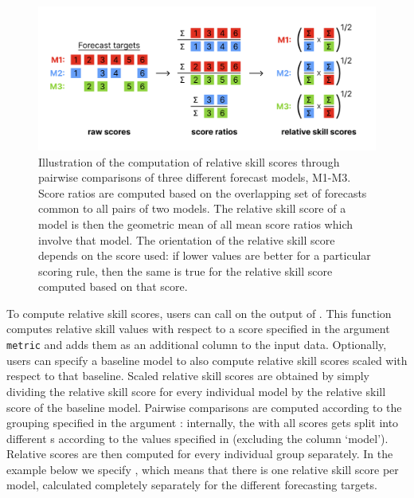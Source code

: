 \documentclass[
]{jss}
\begin{document}
\begin{CodeChunk}
\begin{figure}[!h]

{\centering \includegraphics[width=1\linewidth]{../../man/figures/pairwise-illustration} 

}

\caption[Illustration of the computation of relative skill scores through pairwise comparisons of three different forecast models, M1-M3]{Illustration of the computation of relative skill scores through pairwise comparisons of three different forecast models, M1-M3. Score ratios are computed based on the overlapping set of forecasts common to all pairs of two models. The relative skill score of a model is then the geometric mean of all mean score ratios which involve that model. The orientation of the relative skill score depends on the score used: if lower values are better for a particular scoring rule, then the same is true for the relative skill score computed based on that score.}\label{fig:pairwise-comparison}
\end{figure}
\end{CodeChunk}

To compute relative skill scores, users can call
 on the output of . This
function computes relative skill values with respect to a score
specified in the argument \texttt{metric} and adds them as an additional
column to the input data. Optionally, users can specify a baseline model
to also compute relative skill scores scaled with respect to that
baseline. Scaled relative skill scores are obtained by simply dividing
the relative skill score for every individual model by the relative
skill score of the baseline model. Pairwise comparisons are computed
according to the grouping specified in the argument :
internally, the  with all scores gets split into
different s according to the values specified in
 (excluding the column `model'). Relative scores are then
computed for every individual group separately. In the example below we
specify , which means that there is
one relative skill score per model, calculated completely separately for
the different forecasting targets.
\end{document}
